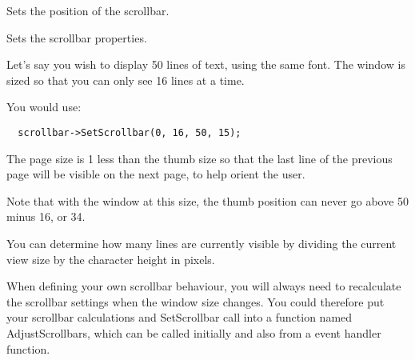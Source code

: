 Sets the position of the scrollbar.





\label{wxscrollbarsetscrollbar}


Sets the scrollbar properties.








Let's say you wish to display 50 lines of text, using the same font.
The window is sized so that you can only see 16 lines at a time.

You would use:

{\small%
\begin{verbatim}
  scrollbar->SetScrollbar(0, 16, 50, 15);
\end{verbatim}
}

The page size is 1 less than the thumb size so that the last line of the previous
page will be visible on the next page, to help orient the user.

Note that with the window at this size, the thumb position can never go
above 50 minus 16, or 34.

You can determine how many lines are currently visible by dividing the current view
size by the character height in pixels.

When defining your own scrollbar behaviour, you will always need to recalculate
the scrollbar settings when the window size changes. You could therefore put your
scrollbar calculations and SetScrollbar
call into a function named AdjustScrollbars, which can be called initially and also
from a  event handler function.

